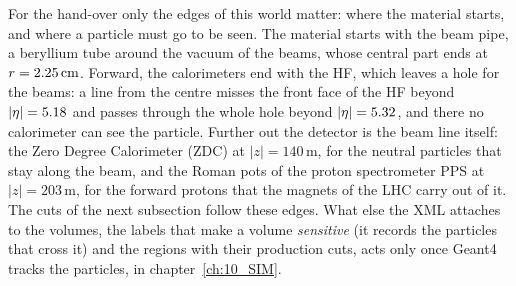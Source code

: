 For the hand-over only the edges of this world matter: where the material starts, and where a particle must go
to be seen. The material starts with the beam pipe, a beryllium tube around the vacuum of the beams, whose central
part ends at $r=2.25\,\mathrm{cm}$. Forward, the calorimeters end with the HF, which leaves a hole for the beams: a line from
the centre misses the front face of the HF beyond $|\eta|=5.18$ and passes through the whole hole beyond
$|\eta|=5.32$, and there no calorimeter can see the particle. Further out the detector is the beam line itself: the
Zero Degree Calorimeter (ZDC) at $|z|=140$\,m, for the neutral particles that stay along the beam, and the Roman
pots of the proton spectrometer PPS at $|z|=203$\,m, for the forward protons that the magnets of the LHC carry out
of it. The cuts of the next subsection follow these edges. What else the XML attaches to the volumes, the labels
that make a volume \emph{sensitive} (it records the particles that cross it) and the regions with their production
cuts, acts only once Geant4 tracks the particles, in chapter~\ref{ch:10_SIM}.

